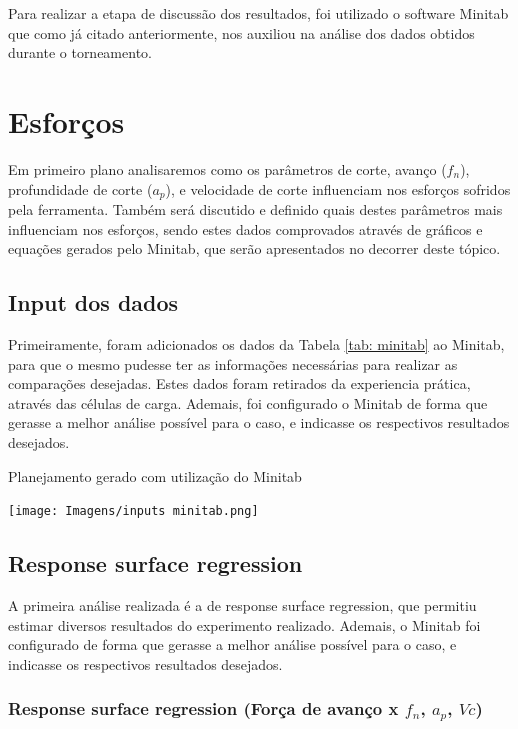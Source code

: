 \documentclass[deposito, acronym, symbols]{fei}
\begin{document}
Para realizar a etapa de discussão dos resultados, foi utilizado o software Minitab que como já citado anteriormente, nos auxiliou na análise dos dados obtidos durante o torneamento. 

\section{Esforços}

Em primeiro plano analisaremos como os parâmetros de corte, avanço ($f_n$), profundidade de corte ($a_p$), e velocidade de corte influenciam nos esforços sofridos pela ferramenta. Também será discutido e definido quais destes parâmetros mais influenciam nos esforços, sendo estes dados comprovados através de gráficos e equações gerados pelo Minitab, que serão apresentados no decorrer deste tópico. 

\subsection{Input dos dados}

Primeiramente, foram adicionados os dados da Tabela \ref{tab: minitab} ao Minitab, para que o mesmo pudesse ter as informações necessárias para realizar as comparações desejadas. Estes dados foram retirados da experiencia prática, através das células de carga. 
Ademais, foi configurado o Minitab de forma que gerasse a melhor análise possível para o caso, e indicasse os respectivos resultados desejados.

\begin{table}[!htb]
 \centering
    \caption{Planejamento gerado com utilização do Minitab}
    \texttt{[image: Imagens/inputs minitab.png]}
    \label{tab: minitab}
 \end{table}
 
\subsection{Response surface regression}

A primeira análise realizada é a de response surface regression, que permitiu estimar diversos resultados do experimento realizado.
Ademais, o Minitab foi configurado de forma que gerasse a melhor análise possível para o caso, e indicasse os respectivos resultados desejados.

\subsubsection{Response surface regression (Força de avanço x $f_n$, $a_p$, $Vc$)}
\end{document}
